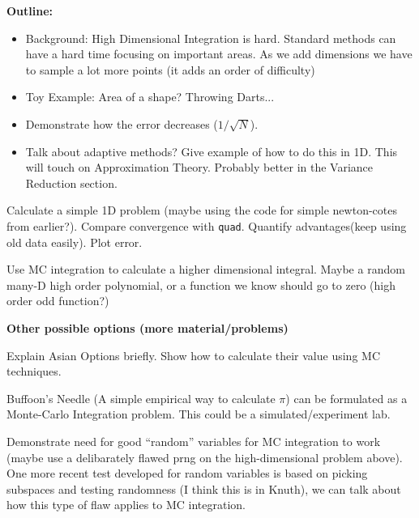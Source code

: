 


{\bf Outline:}

\begin{itemize}
\item Background: High Dimensional Integration is hard. Standard methods can have a hard time focusing on important areas. As we add dimensions we have to sample a lot more points (it adds an order of difficulty)
\item Toy Example: Area of a shape? Throwing Darts...
\item Demonstrate how the error decreases ($1/\sqrt{N}$).
\item Talk about adaptive methods? Give example of how to do this in 1D. This will touch on Approximation Theory. Probably better in the Variance Reduction section.
\end{itemize}

\begin{problem}
Calculate a simple 1D problem (maybe using the code for simple newton-cotes from earlier?). Compare convergence with {\tt quad}. Quantify advantages(keep using old data easily). Plot error.
\end{problem}

\begin{problem}
Use MC integration to calculate a higher dimensional integral. Maybe a random many-D high order polynomial, or a function we know should go to zero (high order odd function?)
\end{problem}

{\bf Other possible options (more material/problems)}

\begin{problem}
Explain Asian Options briefly. Show how to calculate their value using MC techniques.
\end{problem}

\begin{problem}
Buffoon's Needle (A simple empirical way to calculate $\pi$) can be formulated as a Monte-Carlo Integration problem. This could be a simulated/experiment lab.
\end{problem}

\begin{problem}
Demonstrate need for good ``random'' variables for MC integration to work (maybe use a delibarately flawed prng on the high-dimensional problem above). One more recent test developed for random variables is based on picking subspaces and testing randomness (I think this is in Knuth), we can talk about how this type of flaw applies to MC integration.
\end{problem}

